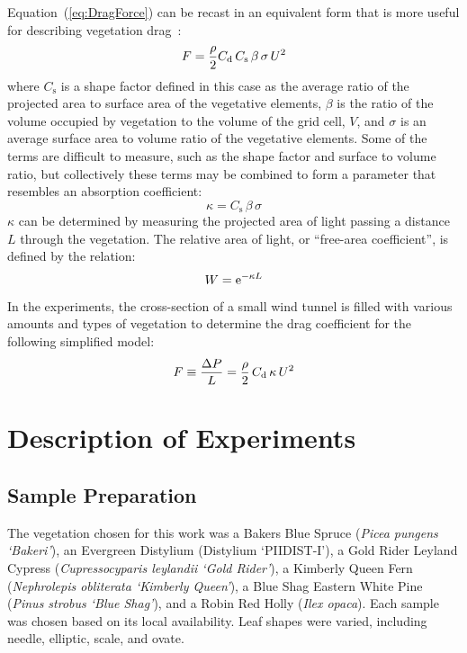 \documentclass[12pt]{article}
\begin{document}
Equation~(\ref{eq:DragForce}) can be recast in an equivalent form that is more useful for describing vegetation drag~\cite{Mueller2014}:
\begin{equation}
\label{eq:DragForcea}
F  = \frac{\rho}{2} C_{\rm d} \, C_{\mathrm{s}} \, \beta \, \sigma \, U^2
\end{equation}
where $C_{\mathrm{s}}$ is a shape factor defined in this case as the average ratio of the projected area to surface area of the vegetative elements, $\beta$ is the ratio of the volume occupied by vegetation to the volume of the grid cell, $V$, and $\sigma$ is an average surface area to volume ratio of the vegetative elements. Some of the terms are difficult to measure, such as the shape factor and surface to volume ratio, but collectively these terms may be combined to form a parameter that resembles an absorption coefficient:
\begin{equation}
\label{eq:Kappa}
\kappa = C_{\mathrm{s}} \, \beta \, \sigma
\end{equation}
$\kappa$ can be determined by measuring the projected area of light passing a distance $L$ through the vegetation. The relative area of light, or ``free-area coefficient'', is defined by the relation:
\begin{equation}\label{eq:WhiteFraction}
W = {\rm e}^{-\kappa L}
\end{equation}
In the experiments, the cross-section of a small wind tunnel is filled with various amounts and types of vegetation to determine the drag coefficient for the following simplified model:
\begin{equation}\label{eq:Pressure}
F \equiv \frac{\Delta P}{L}  = \frac{\rho}{2} \, C_{\rm d} \, \kappa \, U^2
\end{equation}
\pagebreak


\section{Description of Experiments}
\label{sec:Experiments}


\subsection{Sample Preparation}
\label{ssec:SamplePrep}

The vegetation chosen for this work was a Bakers Blue Spruce ({\em Picea pungens `Bakeri'}), an Evergreen Distylium (Distylium `PIIDIST-I'), a Gold Rider Leyland Cypress ({\em Cupressocyparis leylandii `Gold Rider'}), a Kimberly Queen Fern ({\em Nephrolepis obliterata `Kimberly Queen'}), a Blue Shag Eastern White Pine ({\em Pinus strobus `Blue Shag'}), and a Robin Red Holly ({\em Ilex opaca}). Each sample was chosen based on its local availability. Leaf shapes were varied, including needle, elliptic, scale, and ovate.
\end{document}
